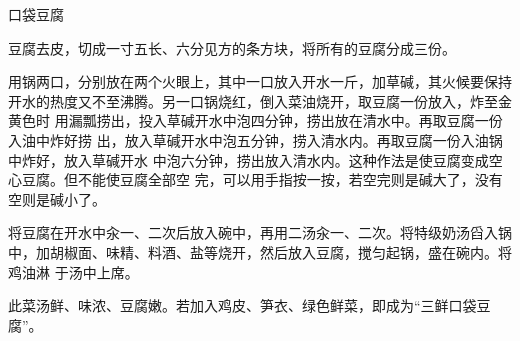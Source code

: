 \begin{recipe}{口袋豆腐}

\ingredients


\preparation

\step 豆腐去皮，切成一寸五长、六分见方的条方块，将所有的豆腐分成三份。

\step 用锅两口，分别放在两个火眼上，其中一口放入开水一斤，加草碱，其火候要保持
开水的热度又不至沸腾。另一口锅烧红，倒入菜油烧开，取豆腐一份放入，炸至金黄色时
用漏瓢捞出，投入草碱开水中泡四分钟，捞出放在清水中。再取豆腐一份入油中炸好捞
出，放入草碱开水中泡五分钟，捞入清水内。再取豆腐一份入油锅中炸好，放入草碱开水
中泡六分钟，捞出放入清水内。这种作法是使豆腐变成空心豆腐。但不能使豆腐全部空
完，可以用手指按一按，若空完则是碱大了，没有空则是碱小了。

\step 将豆腐在开水中汆一、二次后放入碗中，再用二汤汆一、二次。将特级奶汤舀入锅
中，加胡椒面、味精、料酒、盐等烧开，然后放入豆腐，搅匀起锅，盛在碗内。将鸡油淋
于汤中上席。

\features

此菜汤鲜、味浓、豆腐嫩。若加入鸡皮、笋衣、绿色鲜菜，即成为“三鲜口袋豆腐”。

\end{recipe}

